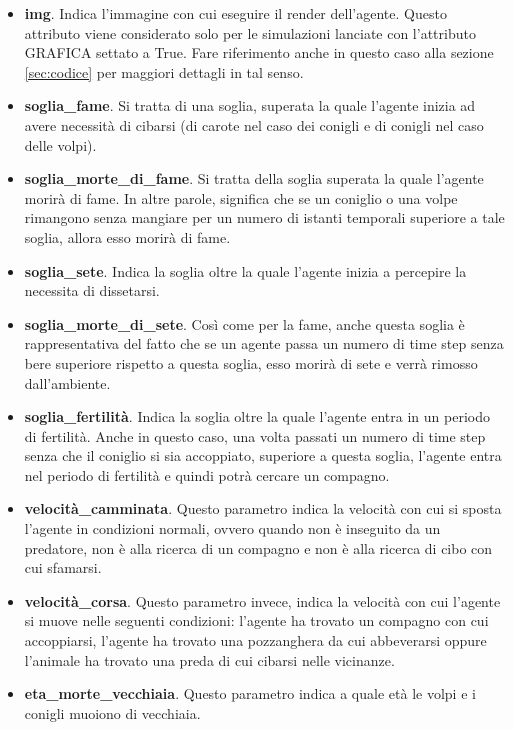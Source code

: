 \documentclass[11pt]{article}
\begin{document}
\begin{itemize}
    \item \textbf{img}. Indica l'immagine con cui eseguire il render dell'agente. Questo attributo viene considerato solo per le simulazioni lanciate con l'attributo GRAFICA settato a True. Fare riferimento anche in questo caso alla sezione \ref{sec:codice} per maggiori dettagli in tal senso. 
    \item \textbf{soglia\_fame}. Si tratta di una soglia, superata la quale l'agente inizia ad avere necessità di cibarsi (di carote nel caso dei conigli e di conigli nel caso delle volpi).
    \item \textbf{soglia\_morte\_di\_fame}. Si tratta della soglia superata la quale l'agente morirà di fame. In altre parole, significa che se un coniglio o una volpe rimangono senza mangiare per un numero di istanti temporali superiore a tale soglia, allora esso morirà di fame.
    \item \textbf{soglia\_sete}. Indica la soglia oltre la quale l'agente inizia a percepire la necessita di dissetarsi. 
    \item \textbf{soglia\_morte\_di\_sete}. Così come per la fame, anche questa soglia è rappresentativa del fatto che se un agente passa un numero di time step senza bere superiore rispetto a questa soglia,  esso morirà di sete e verrà rimosso dall'ambiente. 
    \item \textbf{soglia\_fertilità}. Indica la soglia oltre la quale l'agente entra in un periodo di fertilità. Anche in questo caso, una volta passati un numero di time step senza che il coniglio si sia accoppiato, superiore a questa soglia, l'agente entra nel periodo di fertilità e quindi potrà cercare un compagno.
    \item \textbf{velocità\_camminata}. Questo parametro indica la velocità con cui si sposta l'agente in condizioni normali, ovvero quando non è inseguito da un predatore, non è alla ricerca di un compagno e non è alla ricerca di cibo con cui sfamarsi.  
    \item \textbf{velocità\_corsa}. Questo parametro invece, indica la velocità con cui l'agente si muove nelle seguenti condizioni: l'agente ha trovato un compagno con cui accoppiarsi, l'agente ha trovato una pozzanghera da cui abbeverarsi oppure l'animale ha trovato una preda di cui cibarsi nelle vicinanze.
    \item \textbf{eta\_morte\_vecchiaia}. Questo parametro indica a quale età le volpi e i conigli muoiono di vecchiaia.
\end{itemize}
\end{document}
